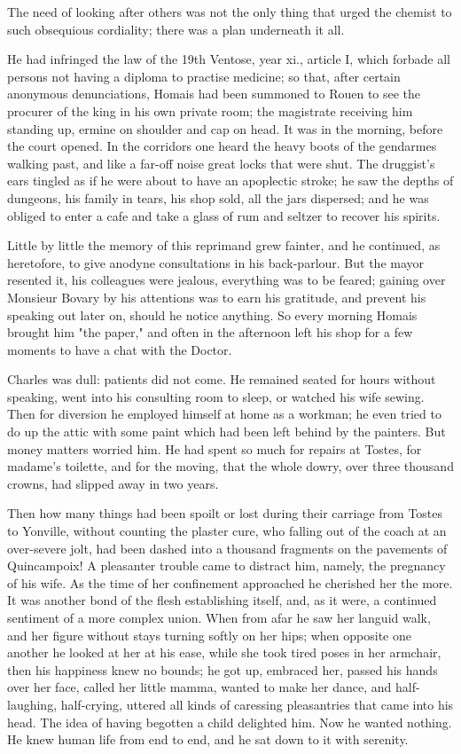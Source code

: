 \documentclass[11pt,twocolumn]{ltugboat}
\begin{document}
The need of looking after others was not the only thing that urged the
chemist to such obsequious cordiality; there was a plan underneath it
all.

He had infringed the law of the 19th Ventose, year xi., article I, which
forbade all persons not having a diploma to practise medicine; so that,
after certain anonymous denunciations, Homais had been summoned to Rouen
to see the procurer of the king in his own private room; the magistrate
receiving him standing up, ermine on shoulder and cap on head. It was
in the morning, before the court opened. In the corridors one heard
the heavy boots of the gendarmes walking past, and like a far-off noise
great locks that were shut. The druggist's ears tingled as if he were
about to have an apoplectic stroke; he saw the depths of dungeons,
his family in tears, his shop sold, all the jars dispersed; and he was
obliged to enter a cafe and take a glass of rum and seltzer to recover
his spirits.

Little by little the memory of this reprimand grew fainter, and
he continued, as heretofore, to give anodyne consultations in his
back-parlour. But the mayor resented it, his colleagues were jealous,
everything was to be feared; gaining over Monsieur Bovary by his
attentions was to earn his gratitude, and prevent his speaking out later
on, should he notice anything. So every morning Homais brought him "the
paper," and often in the afternoon left his shop for a few moments to
have a chat with the Doctor.

Charles was dull: patients did not come. He remained seated for hours
without speaking, went into his consulting room to sleep, or watched
his wife sewing. Then for diversion he employed himself at home as a
workman; he even tried to do up the attic with some paint which had been
left behind by the painters. But money matters worried him. He had
spent so much for repairs at Tostes, for madame's toilette, and for the
moving, that the whole dowry, over three thousand crowns, had slipped
away in two years.

Then how many things had been spoilt or lost during their carriage from
Tostes to Yonville, without counting the plaster cure, who falling out
of the coach at an over-severe jolt, had been dashed into a thousand
fragments on the pavements of Quincampoix! A pleasanter trouble came
to distract him, namely, the pregnancy of his wife. As the time of her
confinement approached he cherished her the more. It was another bond of
the flesh establishing itself, and, as it were, a continued sentiment
of a more complex union. When from afar he saw her languid walk, and
her figure without stays turning softly on her hips; when opposite one
another he looked at her at his ease, while she took tired poses in her
armchair, then his happiness knew no bounds; he got up, embraced her,
passed his hands over her face, called her little mamma, wanted to
make her dance, and half-laughing, half-crying, uttered all kinds of
caressing pleasantries that came into his head. The idea of having
begotten a child delighted him. Now he wanted nothing. He knew human
life from end to end, and he sat down to it with serenity.
\end{document}
